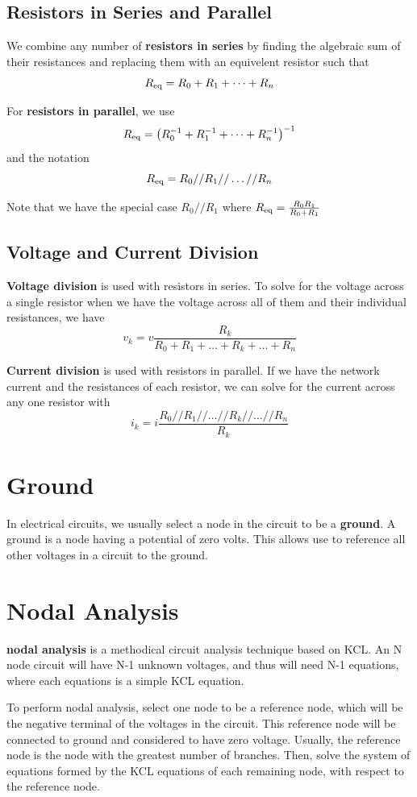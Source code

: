 \documentclass[12pt]{article}
\begin{document}
\subsection*{Resistors in Series and Parallel}
We combine any number of {\bf resistors in series} by finding the algebraic sum of their resistances and replacing them with an equivelent resistor such that \[ R_{{\rm eq}} = R_0 + R_1 + \dots + R_n \]

For {\bf resistors in parallel}, we use \[ R_{{\rm eq}} = \bigl(R_0^{-1} + R_1^{-1} + \dots + R_n^{-1}\bigl)^{-1} \] and the notation \[ R_{{\rm eq}} = R_0//R_1//\dots//R_n \]

Note that we have the special case $R_0//R_1$ where $R_{{\rm eq}} = \frac{R_0R_1}{R_0 + R_1}$

\subsection*{Voltage and Current Division}
{\bf Voltage division} is used with resistors in series. To solve for the voltage across a single resistor when we have the voltage across all of them and their individual resistances, we have \[ v_k = v\frac{R_k}{R_0 + R_1 + \dots + R_k + \dots + R_n} \]

{\bf Current division} is used with resistors in parallel. If we have the network current and the resistances of each resistor, we can solve for the current across any one resistor with \[ i_k = i\frac{R_0//R_1//\dots//R_k//\dots//R_n}{R_k} \]

\section*{Ground}
In electrical circuits, we usually select a node in the circuit to be a {\bf ground}. A ground is a node having a potential of zero volts. This allows use to reference all other voltages in a circuit to the ground.

\section*{Nodal Analysis}
{\bf nodal analysis} is a methodical circuit analysis technique based on KCL. An N node circuit will have N-1 unknown voltages, and thus will need N-1 equations, where each equations is a simple KCL equation.

To perform nodal analysis, select one node to be a reference node, which will be the negative terminal of the voltages in the circuit. This reference node will be connected to ground and considered to have zero voltage. Usually, the reference node is the node with the greatest number of branches. Then, solve the system of equations formed by the KCL equations of each remaining node, with respect to the reference node.
\end{document}
